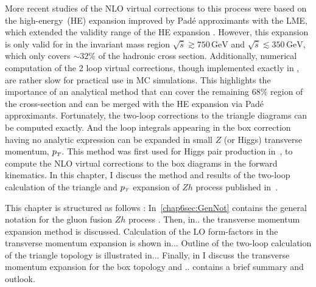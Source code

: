 \par More recent studies of the NLO virtual corrections to this process were based on the high-energy~(HE) expansion improved by Pad\'e approximants with the LME, which extended the validity range of the HE expansion \cite{Davies:2020drs}. However, this expansion is only valid for in the invariant mass region $\sqrt{\hat{s}}  \gtrsim 750\, \si{\GeV} $ and $\sqrt{\hat{s}}  \lesssim 350\,  \si{\GeV}$,  which only covers $\sim 32\%$ of the hadronic cross section. Additionally, numerical computation of the 2 loop virtual corrections, though implemented exactly in  \cite{Chen:2020gae}, are rather slow for practical use in MC simulations.  This highlights the importance of an analytical method that can cover the remaining $68\%$ region of the cross-section and can be merged with the HE expansion via Pad\'e approximants. Fortunately, the two-loop corrections to the triangle diagrams can be computed exactly. And the loop integrals appearing in the box correction having no analytic expression can be expanded in small  $Z$ (or Higgs) 
transverse momentum, $p_{\scriptscriptstyle T}$. This method was first used for Higgs pair production in~\cite{Bonciani:2018omm}, to compute the NLO virtual corrections to the box diagrams in the forward kinematics.  In this chapter, I discuss the method and results of the two-loop calculation of the triangle and $p_{\scriptscriptstyle T}$ expansion of $Zh$ process published in~\cite{Alasfar:2021ppe}. 
\par This chapter is structured as follows : In~\autoref{chap6sec:GenNot} contains the general notation for the gluon fusion $Zh$ process . Then, in.. the transverse momentum expansion method is discussed.  Calculation of the LO form-factors in the transverse momentum expansion is shown in... Outline of the two-loop calculation of the triangle topology is illustrated in... Finally, in  I discuss the transverse momentum expansion for the box topology and  .. contains a brief summary and outlook. 

